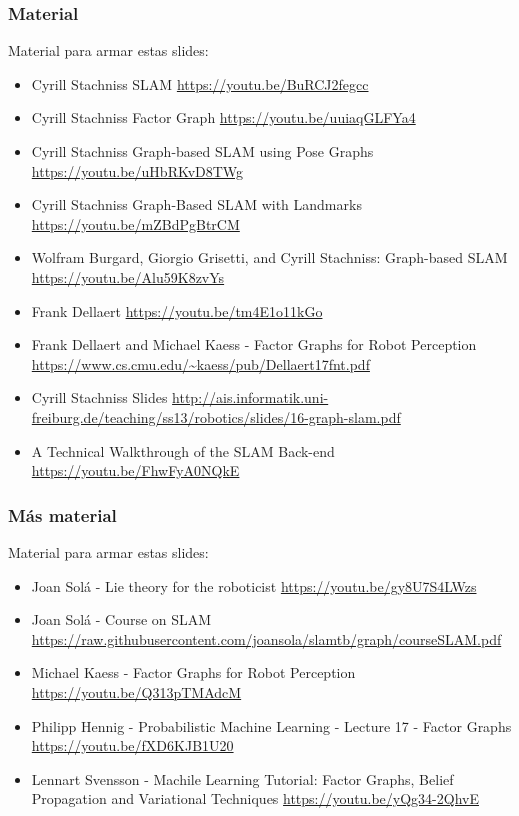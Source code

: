 \begin{frame}
	\frametitle{Material}
	
	Material para armar estas slides:
	\begin{itemize}
		\item Cyrill Stachniss SLAM \url{https://youtu.be/BuRCJ2fegcc}
   		\item Cyrill Stachniss Factor Graph \url{https://youtu.be/uuiaqGLFYa4}
		\item Cyrill Stachniss Graph-based SLAM using Pose Graphs \url{https://youtu.be/uHbRKvD8TWg}
		\item Cyrill Stachniss Graph-Based SLAM with Landmarks \url{https://youtu.be/mZBdPgBtrCM}
		\item Wolfram Burgard, Giorgio Grisetti, and Cyrill Stachniss: Graph-based SLAM \url{https://youtu.be/Alu59K8zvYs}
		\item Frank Dellaert \url{https://youtu.be/tm4E1o11kGo}
        \item Frank Dellaert and Michael Kaess - Factor Graphs for Robot Perception \url{https://www.cs.cmu.edu/~kaess/pub/Dellaert17fnt.pdf}
        \item Cyrill Stachniss Slides \url{http://ais.informatik.uni-freiburg.de/teaching/ss13/robotics/slides/16-graph-slam.pdf}
        \item A Technical Walkthrough of the SLAM Back-end \url{https://youtu.be/FhwFyA0NQkE}
	\end{itemize}
	
\end{frame}

\begin{frame}
	\frametitle{Más material}
	
	Material para armar estas slides:
	\begin{itemize}
		\item Joan Solá - Lie theory for the roboticist \url{https://youtu.be/gy8U7S4LWzs}
		\item Joan Solá - Course on SLAM \url{https://raw.githubusercontent.com/joansola/slamtb/graph/courseSLAM.pdf}
		\item Michael Kaess - Factor Graphs for Robot Perception \url{https://youtu.be/Q313pTMAdcM}
		\item Philipp Hennig - Probabilistic Machine Learning - Lecture 17 - Factor Graphs \url{https://youtu.be/fXD6KJB1U20}
		\item Lennart Svensson - Machile Learning Tutorial: Factor Graphs, Belief Propagation and Variational Techniques \url{https://youtu.be/yQg34-2QhvE}
	\end{itemize}
	
\end{frame}



